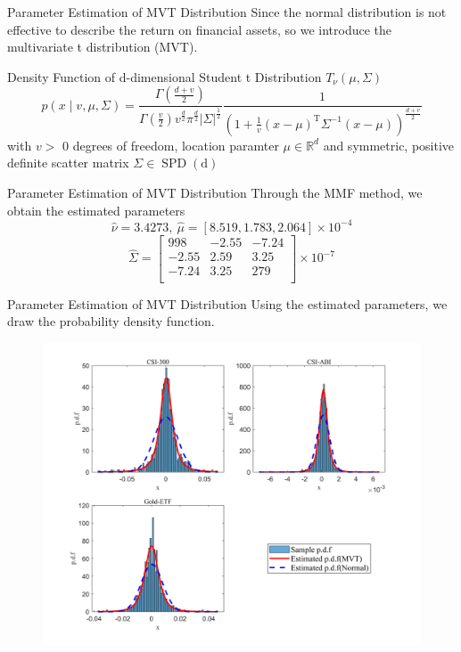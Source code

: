 \documentclass{beamer}
\begin{document}
\begin{frame}{Parameter Estimation of MVT Distribution}
Since the normal distribution is not effective to describe the return
on financial assets, so we introduce the multivariate t distribution (MVT). 

\begin{block}{Density Function of d-dimensional Student t Distribution $T_\nu(\mu, \Sigma)$}
\begin{equation*}\label{E1.1}
p(x \mid v, \mu, \Sigma)=\frac{\Gamma\left(\frac{d+v}{2}\right)}{\Gamma\left(\frac{v}{2}\right) v^{\frac{d}{2}} \pi^{\frac{d}{2}}|\Sigma|^{\frac{1}{2}}} \frac{1}{\left(1+\frac{1}{v}(x-\mu)^{\mathrm{T}} \Sigma^{-1}(x-\mu)\right)^{\frac{d+v}{2}}}
\end{equation*} 
with $v>$ 0 degrees of freedom, location paramter $\mu \in \mathbb{R}^d$ and symmetric, positive definite scatter matrix $\Sigma \in \operatorname{SPD}(\mathrm{d})$ 
\end{block}
    
\end{frame}
\begin{frame}{Parameter Estimation of MVT Distribution}
Through the MMF method, we obtain the estimated parameters
$$
\hat{\nu}=3.4273,\:\hat{\mu}=[8.519,1.783,2.064]\times 10^{-4}
$$
$$
\hat{\Sigma}=\begin{bmatrix}
  998 &  -2.55 &  -7.24 \\
 -2.55 &   2.59 &   3.25 \\
 -7.24 &   3.25 &   279 \\    
\end{bmatrix} \times 10^{-7}
$$
\end{frame}

\begin{frame}{Parameter Estimation of MVT Distribution}
Using the estimated parameters, we draw the probability density function. 
\begin{figure}[H]
    \centering
    \includegraphics[scale=0.4]{Figure/FIG3-PDF.png}
    \label{Fig3}
\end{figure}
\end{frame}
\end{document}
